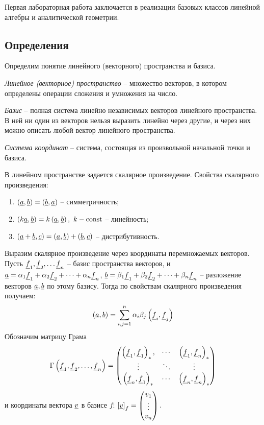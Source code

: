 Первая лабораторная работа заключается в реализации базовых классов линейной алгебры и аналитической геометрии.

\subsection{Определения}

	Определим понятие линейного (векторного) пространства и базиса. 

	\textit{Линейное (векторное) пространство} -- множество векторов, в котором определены операции сложения и умножения на число.

	\textit{Базис} -- полная система линейно независимых векторов линейного пространства. В ней ни один из векторов нельзя выразить линейно через другие, и через них можно описать любой вектор линейного пространства.
	
	\textit{Система координат} -- система, состоящая из произвольной начальной точки и базиса. 

	В линейном пространстве задается скалярное произведение. Свойства скалярного произведения:
	\begin{enumerate}
		\item \( \left( \underline{a}, \underline{b} \right) = \left( \underline{b}, \underline{a} \right) \) -- симметричность;
		\item \( \left( k \underline{a}, \underline{b} \right) = k\left( \underline{a}, \underline{b} \right), ~ k - \mathrm{const} \) -- линейность;
		\item \( \left( \underline{a} + \underline{b}, \underline{c} \right) = \left( \underline{a}, \underline{b} \right) + \left( \underline{b}, \underline{c} \right) \) -- дистрибутивность.
	\end{enumerate} 

	Выразим скалярное произведение через координаты перемножаемых векторов. Пусть \( \underline{f}_1, \underline{f}_2, \dots \underline{f}_n \) -- базис пространства векторов, и \( \underline{a} = \alpha_1 \underline{f}_1 + \alpha_2 \underline{f}_2 + \dots + \alpha_n \underline{f}_n \), \( \underline{b} = \beta_1 \underline{f}_1 + \beta_2 \underline{f}_2 + \dots + \beta_n \underline{f}_n \) -- разложение векторов $\underline{a}, \underline{b}$ по этому базису. Тогда по свойствам скалярного произведения получаем:
	\[ \left( \underline{a}, \underline{b} \right) = \sum_{i, j = 1}^{n} \alpha_i \beta_j \left( \underline{f}_i, \underline{f}_j \right) \]
	Обозначим матрицу Грама
	\[ 
		\Gamma \left( \underline{f}_1, \underline{f}_2, \dots, \underline{f}_n \right) = 
		\begin{pmatrix} 
			\left( \underline{f}_1, \underline{f}_1 \right)_*, & \cdots & \left( \underline{f}_1, \underline{f}_n \right)_* \\ 
			\vdots & \ddots & \vdots \\ 
			\left( \underline{f}_n, \underline{f}_1 \right)_* & \cdots & \left( \underline{f}_n, \underline{f}_n \right)_*
		\end{pmatrix}
	\]
	и координаты вектора $\underline{v}$ в базисе $f$:
	\( \left[ \underline{v} \right]_f = \begin{pmatrix} v_1 \\ \vdots \\ v_n \end{pmatrix}. \)
	
